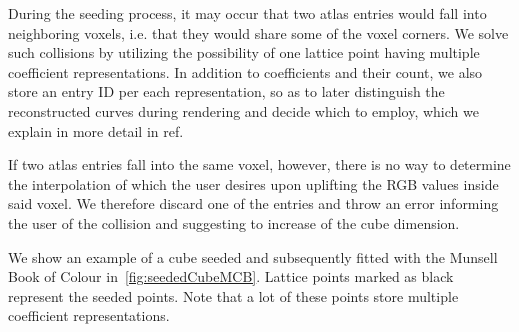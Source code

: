 During the seeding process, it may occur that two atlas entries would fall into neighboring voxels, i.e. that they would share some of the voxel corners. We solve such collisions by utilizing the possibility of one lattice point having multiple coefficient representations. In addition to coefficients and their count, we also store an entry ID per each representation, so as to later distinguish the reconstructed curves during rendering and decide which to employ, which we explain in more detail in ref.

If two atlas entries fall into the same voxel, however, there is no way to determine the interpolation of which the user desires upon uplifting the RGB values inside said voxel. We therefore discard one of the entries and throw an error informing the user of the collision and suggesting to increase of the cube dimension.

We show an example of a cube seeded and subsequently fitted with the Munsell Book of Colour in~\cref{fig:seededCubeMCB}. Lattice points marked as black represent the seeded points. Note that a lot of these points store multiple coefficient representations.

